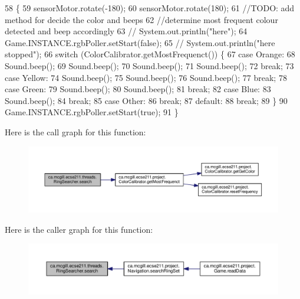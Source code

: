 \begin{DoxyCode}
58                         \{
59     sensorMotor.rotate(-180);
60     sensorMotor.rotate(180);
61     \textcolor{comment}{//TODO: add method for decide the color and beeps}
62     \textcolor{comment}{//determine most frequent colour detected and beep accordingly}
63  \textcolor{comment}{//   System.out.println("here");}
64     Game.INSTANCE.rgbPoller.setStart(\textcolor{keyword}{false});
65  \textcolor{comment}{//   System.out.println("here stopped");}
66     \textcolor{keywordflow}{switch} (ColorCalibrator.getMostFrequenct()) \{
67       \textcolor{keywordflow}{case} Orange:
68         Sound.beep();
69         Sound.beep();
70         Sound.beep();
71         Sound.beep();
72         \textcolor{keywordflow}{break};
73       \textcolor{keywordflow}{case} Yellow:
74         Sound.beep();
75         Sound.beep();
76         Sound.beep();
77         \textcolor{keywordflow}{break};
78       \textcolor{keywordflow}{case} Green:
79         Sound.beep();
80         Sound.beep();
81         \textcolor{keywordflow}{break};
82       \textcolor{keywordflow}{case} Blue:
83         Sound.beep();
84         \textcolor{keywordflow}{break};
85       \textcolor{keywordflow}{case} Other:
86         \textcolor{keywordflow}{break};
87       \textcolor{keywordflow}{default}:
88         \textcolor{keywordflow}{break};
89     \}
90     Game.INSTANCE.rgbPoller.setStart(\textcolor{keyword}{true});
91   \}
\end{DoxyCode}
Here is the call graph for this function\+:
\nopagebreak
\begin{figure}[H]
\begin{center}
\leavevmode
\includegraphics[width=350pt]{classca_1_1mcgill_1_1ecse211_1_1threads_1_1_ring_searcher_abd2b2c172ea393ce4185027c8a12780f_cgraph}
\end{center}
\end{figure}
Here is the caller graph for this function\+:
\nopagebreak
\begin{figure}[H]
\begin{center}
\leavevmode
\includegraphics[width=350pt]{classca_1_1mcgill_1_1ecse211_1_1threads_1_1_ring_searcher_abd2b2c172ea393ce4185027c8a12780f_icgraph}
\end{center}
\end{figure}
